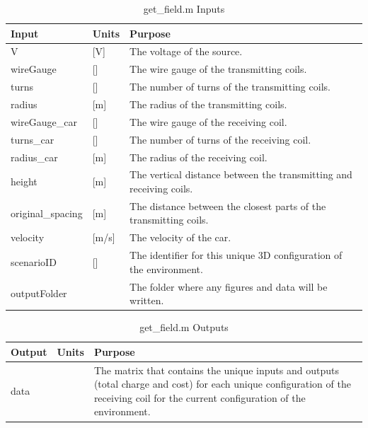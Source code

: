 \begin{table}[H]
    \caption[get\_field.m Inputs]{get\_field.m Inputs}
    \begin{center}
    \begin{tabular}{| p{} | p{} | p{} |}
    \hline
    Input & Units & Purpose \\
    \hline \hline
    V & [V] & The voltage of the source. \\
    wireGauge & [] & The wire gauge of the transmitting coils. \\
    turns & [] & The number of turns of the transmitting coils. \\
    radius & [m] & The radius of the transmitting coils. \\
    wireGauge\_car & [] & The wire gauge of the receiving coil. \\
    turns\_car & [] & The number of turns of the receiving coil. \\
    radius\_car & [m] & The radius of the receiving coil. \\
    height & [m] & The vertical distance between the transmitting and receiving coils. \\
    original\_spacing & [m] & The distance between the closest parts of the transmitting coils. \\
    velocity & [m/s] & The velocity of the car. \\
    scenarioID & [] & The identifier for this unique 3D configuration of the environment. \\
    outputFolder & & The folder where any figures and data will be written. \\
    \hline
    \end{tabular}
    \end{center}
    \label{t5}
\end{table}

\begin{table}[H]
    \caption[get\_field.m Outputs]{get\_field.m Outputs}
    \begin{center}
    \begin{tabular}{| p{} | p{} | p{} |}
    \hline
    Output & Units & Purpose \\
    \hline \hline
    data & & The matrix that contains the unique inputs and outputs (total charge and cost) for each unique configuration of the receiving coil for the current configuration of the environment. \\
    \hline
    \end{tabular}
    \end{center}
    \label{t6}
\end{table}

